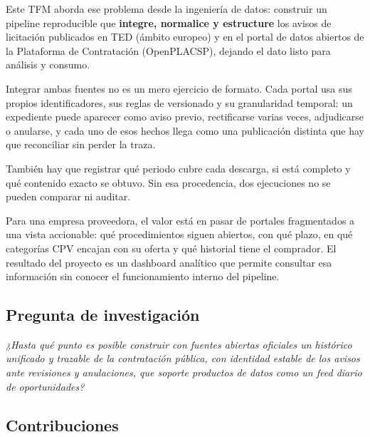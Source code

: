 \documentclass[11pt,a4paper]{article}
\begin{document}
Este TFM aborda ese problema desde la ingeniería de datos: construir un
pipeline reproducible que \textbf{integre, normalice y estructure} los avisos de
licitación publicados en TED (ámbito europeo) y en el portal de datos abiertos
de la Plataforma de Contratación (OpenPLACSP), dejando el dato listo para
análisis y consumo.

Integrar ambas fuentes no es un mero ejercicio de formato. Cada portal usa sus
propios identificadores, sus reglas de versionado y su granularidad temporal:
un expediente puede aparecer como aviso previo, rectificarse varias veces,
adjudicarse o anularse, y cada uno de esos hechos llega como una publicación
distinta que hay que reconciliar sin perder la traza.

También hay que registrar qué periodo cubre cada descarga, si está completo y
qué contenido exacto se obtuvo. Sin esa procedencia, dos ejecuciones no se
pueden comparar ni auditar.

Para una empresa proveedora, el valor está en pasar de portales fragmentados a
una vista accionable: qué procedimientos siguen abiertos, con qué plazo, en
qué categorías CPV encajan con su oferta y qué historial tiene el comprador.
El resultado del proyecto es un dashboard analítico que permite consultar esa
información sin conocer el funcionamiento interno del pipeline.

\subsection{Pregunta de investigación}

\emph{¿Hasta qué punto es posible construir con fuentes abiertas oficiales un
histórico unificado y trazable de la contratación pública, con identidad
estable de los avisos ante revisiones y anulaciones, que soporte productos de
datos como un feed diario de oportunidades?}

\subsection{Contribuciones}
\end{document}
